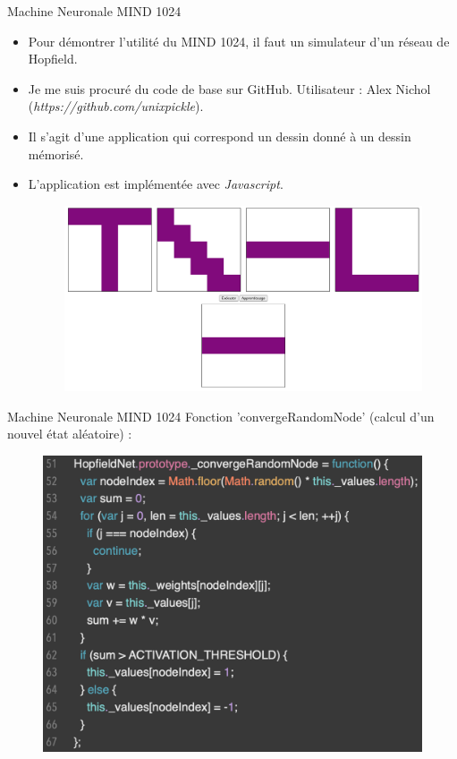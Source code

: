 \documentclass{beamer}
\begin{document}
\begin{frame}{Machine Neuronale MIND 1024}
    \begin{itemize}[<+-| alert@+>] %
        \item Pour démontrer l'utilité du MIND 1024, il faut un simulateur d'un réseau de Hopfield.
        \item Je me suis procuré du code de base sur GitHub. Utilisateur : Alex Nichol (\textit{https://github.com/unixpickle}).
        \item Il s'agit d'une application qui correspond un dessin donné à un dessin mémorisé.
        \item L'application est implémentée avec \textit{Javascript}.
        \begin{figure}
            \centering
            \includegraphics[width=0.7\linewidth]{pic/app1.png}
        \end{figure}
    \end{itemize}
\end{frame}

\begin{frame}{Machine Neuronale MIND 1024}
    Fonction 'convergeRandomNode' (calcul d'un nouvel état aléatoire) :
    \begin{figure}
        \centering
        \includegraphics[width=0.7\linewidth]{pic/alg1.png}
    \end{figure}
\end{frame}  
\end{document}
